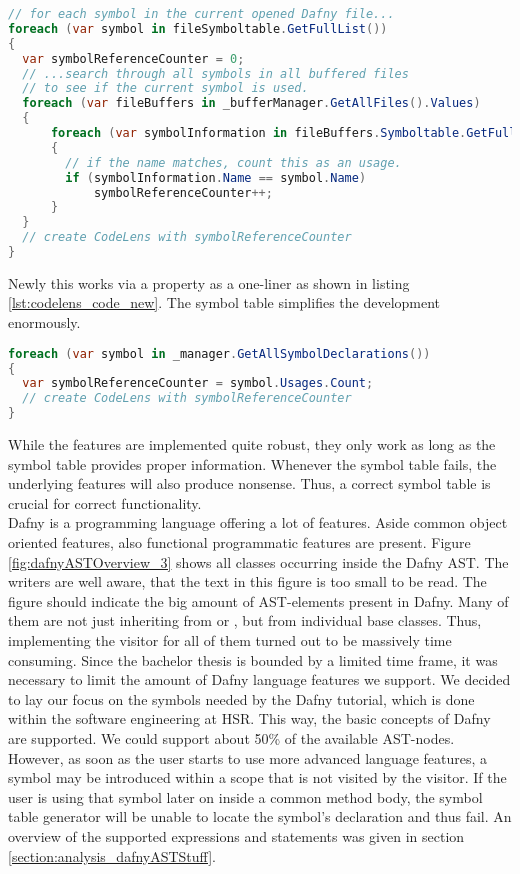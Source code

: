 \begin{lstlisting}[language=csharp, caption={Example for \textit{CodeLens} in the Prototype}, captionpos=b, label={lst:codelens_code_old}]
// for each symbol in the current opened Dafny file...
foreach (var symbol in fileSymboltable.GetFullList())
{
  var symbolReferenceCounter = 0;
  // ...search through all symbols in all buffered files
  // to see if the current symbol is used.
  foreach (var fileBuffers in _bufferManager.GetAllFiles().Values)
  {
      foreach (var symbolInformation in fileBuffers.Symboltable.GetFullList())
      {
        // if the name matches, count this as an usage.
        if (symbolInformation.Name == symbol.Name)
            symbolReferenceCounter++;
      }
  }
  // create CodeLens with symbolReferenceCounter
}
\end{lstlisting}

Newly this works via a property as a one-liner as shown in listing \ref{lst:codelens_code_new}.
The symbol table simplifies the development enormously.

\begin{lstlisting}[language=csharp, caption={Example for \textit{CodeLens} With the new Symbol Table}, captionpos=b, label={lst:codelens_code_new}]
foreach (var symbol in _manager.GetAllSymbolDeclarations())
{
  var symbolReferenceCounter = symbol.Usages.Count;
  // create CodeLens with symbolReferenceCounter
}
\end{lstlisting}

While the features are implemented quite robust, they only work as long as the symbol table provides proper information.
Whenever the symbol table fails, the underlying features will also produce nonsense.
Thus, a correct symbol table is crucial for correct functionality.\\

Dafny is a programming language offering a lot of features.
Aside common object oriented features, also functional programmatic features are present.
Figure \ref{fig:dafnyASTOverview_3} shows all classes occurring inside the Dafny AST.
The writers are well aware, that the text in this figure is too small to be read.
The figure should indicate the big amount of AST-elements present in Dafny.
Many of them are not just inheriting from  or , but from individual base classes.
Thus, implementing the visitor for all of them turned out to be massively time consuming.
Since the bachelor thesis is bounded by a limited time frame, it was necessary to limit the amount of Dafny language features we support.
We decided to lay our focus on the symbols needed by the Dafny tutorial, which is done within the software engineering at HSR.
This way, the basic concepts of Dafny are supported.
We could support about 50\% of the available AST-nodes.
However, as soon as the user starts to use more advanced language features, a symbol may be introduced within a scope that is not visited by the visitor.
If the user is using that symbol later on inside a common method body, the symbol table generator will be unable to locate the symbol's declaration and thus fail.
An overview of the supported expressions and statements was given in section \ref{section:analysis_dafnyASTStuff}.\\

